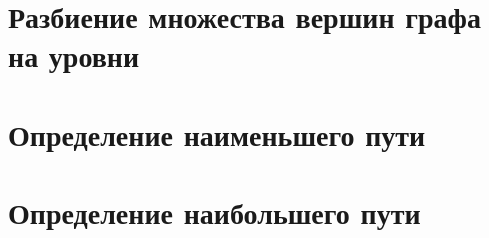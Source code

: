 \section{Разбиение множества вершин графа на уровни}

\section{Определение наименьшего пути}

\section{Определение наибольшего пути}

